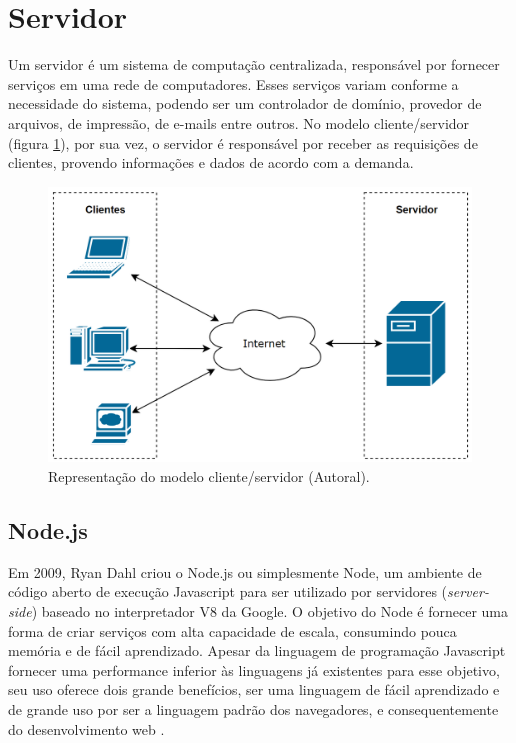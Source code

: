 \section{Servidor}
\label{fund:servidor}
Um servidor é um sistema de computação centralizada, responsável por fornecer serviços em uma rede de computadores. Esses serviços variam conforme a necessidade do sistema, podendo ser um controlador de domínio, provedor de arquivos, de impressão, de e-mails entre outros. No modelo cliente/servidor (figura \ref{fig:client-server-model}), por sua vez, o servidor é responsável por receber as requisições de clientes, provendo informações e dados de acordo com a demanda.

\begin{figure}[H]
  \centering
  \includegraphics[width=.80\textwidth]{assets/client-server-model.png} 
  \caption{Representação do modelo cliente/servidor (Autoral).}
  \label{fig:client-server-model} 
\end{figure}

\subsection{Node.js}
\label{fund:node}
Em 2009, Ryan Dahl criou o Node.js ou simplesmente Node, um ambiente de código aberto de execução Javascript para ser utilizado por servidores (\textit{server-side}) baseado no interpretador V8 da Google. O objetivo do Node é fornecer uma forma de criar serviços com alta capacidade de escala, consumindo pouca memória e de fácil aprendizado. Apesar da linguagem de programação Javascript fornecer uma performance inferior às linguagens já existentes para esse objetivo, seu uso oferece dois grande benefícios, ser uma linguagem de fácil aprendizado e de grande uso por ser a linguagem padrão dos navegadores, e consequentemente do desenvolvimento web \cite{tilkov2010node}.

